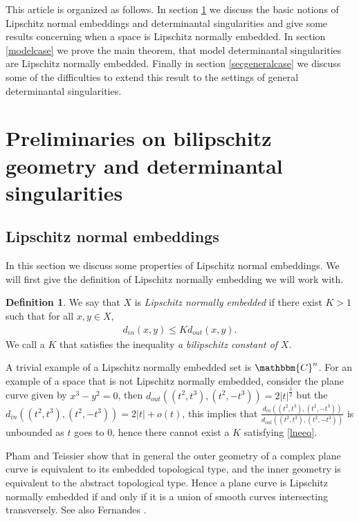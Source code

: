 \documentclass[a4paper,oneside]{amsart}
\theoremstyle{definition}
\newtheorem{defn}[thm]{Definition}
\begin{document}
This article is organized as follows. In section \ref{preliminaries}
we discuss the basic notions of Lipschitz normal embeddings and
determinantal singularities and give some results concerning when a
space is Lipschitz normally embedded. In section \ref{modelcase} we
prove the main theorem, that model determinantal singularities are
Lipschitz normally embedded. Finally in section \ref{secgeneralcase} we
discuss some of the difficulties to extend this result to the settings
of general determinantal singularities.

\section{Preliminaries on bilipschitz geometry and determinantal
  singularities}\label{preliminaries}

\subsection*{Lipschitz normal embeddings}

In this section we discuss some properties of Lipschitz normal
embeddings. We will first give the definition of Lipschitz normally
embedding we will work with.
\begin{defn}
We say that $X$ is \emph{Lipschitz normally embedded} if there exist
$K>1$ such that for all $x,y\in X$,
\begin{align}
d_{in}(x,y)\leq Kd_{out}(x,y).\label{lneeq}
\end{align}
We call a $K$ that satisfies the inequality \emph{a bilipschitz
  constant of} $X$.
\end{defn}

A trivial example of a Lipschitz normally embedded set is ${\mathbbm{C}}^n$. For
an example of a space that is not Lipschitz normally embedded,
consider the plane curve given by $x^3-y^2=0$, then
$d_{out}((t^2,t^3),(t^2,-t^3))=2{\lvert {t} \rvert}^{\tfrac{3}{2}}$ but the
$d_{in}((t^2,t^3),(t^2,-t^3))= 2{\lvert {t} \rvert}+ o(t)$, this implies that
$\tfrac{d_{in}((t^2,t^3),(t^2,-t^3))}{d_{out}((t^2,t^3),(t^2,-t^3))}$
is unbounded as $t$ goes to $0$, hence there cannot exist a $K$
satisfying \eqref{lneeq}.

Pham and Teissier \cite{phamteissier} show that in general the outer
geometry of a complex plane curve is equivalent to its embedded
topological type, and the inner geometry is equivalent to the abstract
topological type. Hence a plane curve is Lipschitz normally embedded
if and only if it is a union of smooth curves intersecting
transversely. See also Fernandes \cite{fernandesplanecurve}.
\end{document}
